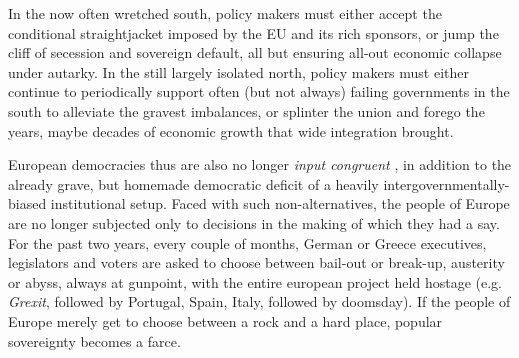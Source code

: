 \documentclass[11pt,a4paper,oneside,openright]{article}
\begin{document}
In the now often wretched south, policy makers must either accept the conditional straightjacket imposed by the \gls{EU} and its rich sponsors, or jump the cliff of secession and sovereign default, all but ensuring all-out economic collapse under autarky. 
In the still largely isolated north, policy makers must either continue to periodically support often (but not always) failing governments in the south to alleviate the gravest imbalances, or splinter the union and forego the years, maybe decades of economic growth that wide integration brought.

European democracies thus are also no longer \emph{input congruent} \citep{Zurn-2000-aa}, in addition to the already grave, but homemade democratic deficit of a heavily intergovernmentally-biased institutional setup. 
Faced with such non-alternatives, the people of Europe are no longer subjected only to decisions in the making of which they had a say. 
For the past two years, every couple of months, German or Greece executives, legislators and voters are asked to choose between bail-out or break-up, austerity or abyss, always at gunpoint, with the entire european project held hostage (e.g. \emph{Grexit}, followed by Portugal, Spain, Italy, followed by doomsday). 
If the people of Europe merely get to choose between a rock and a hard place, popular sovereignty becomes a farce.
\end{document}
